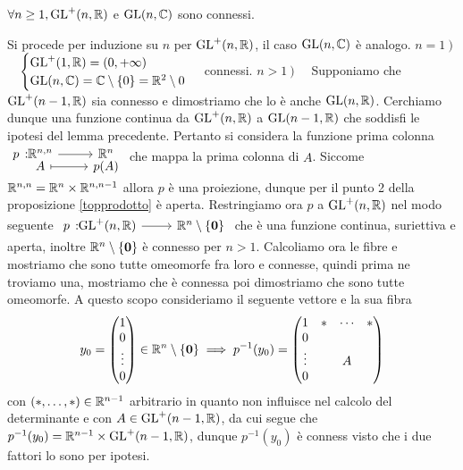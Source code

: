 \begin{theorema}
	$\forall n\geq 1, \operatorname{GL}^+(n,\mathbb{R})$ e $\operatorname{GL}(n,\mathbb{C})$ sono connessi.
\end{theorema}
\begin{demonstration}
	Si procede per induzione su $n$ per $\operatorname{GL}^+(n,\mathbb{R})$, il caso $\operatorname{GL}(n,\mathbb{C})$ è analogo.\newline
	$n=1 \ )$ \ \ $\begin{cases}
			\operatorname{GL}^+(1,\mathbb{R})=(0,+\infty) \\
			\operatorname{GL}(n,\mathbb{C})=\mathbb{C}\setminus\{0\}=\mathbb{R}^2\setminus{0}
		\end{cases}$ connessi.\newline
	$n>1 \ )$ \ \ Supponiamo che $\operatorname{GL}^+(n-1,\mathbb{R})$ sia connesso e dimostriamo che lo è anche $\operatorname{GL}(n,\mathbb{R})$. Cerchiamo dunque una funzione continua da $\operatorname{GL}^+(n,\mathbb{R})$  a $\operatorname{GL}(n-1,\mathbb{R})$ che soddisfi le ipotesi del lemma precedente. Pertanto si considera la funzione prima colonna $\displaystyle \funztot p {\realset^{n,n}} {\realset^n} A {p(A)}$ che mappa la prima colonna di $A$. Siccome $\mathbb{R}^{n,n}=\mathbb{R}^n\times\mathbb{R}^{n,n-1}$ allora $p$ è una proiezione, dunque per il punto 2 della proposizione \ref{topprodotto}	è aperta. Restringiamo ora $p$ a $\operatorname{GL}^+(n,\mathbb{R})$ nel modo seguente $\funz p {\gl^+(n,\realset)} {\realset^n\setminus\{\mathbf{0}\}}$ che è una funzione continua, suriettiva e aperta, inoltre $\mathbb{R}^n\setminus\{\mathbf{0}\}$ è connesso per $n>1$. Calcoliamo ora le fibre e mostriamo che sono tutte omeomorfe fra loro e connesse, quindi prima ne troviamo una, mostriamo che è connessa poi dimostriamo che sono tutte omeomorfe. A questo scopo consideriamo il seguente vettore e la sua fibra
		\begin{gather*}
			y_0=\begin{pmatrix}
					1 \\ 0 \\ \vdots \\ 0
				\end{pmatrix}\in \mathbb{R}^n\setminus\{\mathbf{0}\} \implies p^{-1}	(y_0)=\begin{pmatrix}
						1      & * & \cdots & *\\
						0      &   &       &  \\
						\vdots &   & A     &  \\
						0      &   &       &
					\end{pmatrix}
		\end{gather*}
	con $(*,\dots, *)\in\mathbb{R}^{n-1}$ arbitrario in quanto non influisce nel calcolo del determinante e con $A\in\operatorname{GL}^+(n-1,\mathbb{R})$, da cui segue che $p^{-1}(y_0)=\mathbb{R}^{n-1}\times\operatorname{GL}^+(n-1,\mathbb{R})$, dunque $p^{-1}(y_0)$ è conness visto che i due fattori lo sono per ipotesi.\newline

\end{demonstration}
